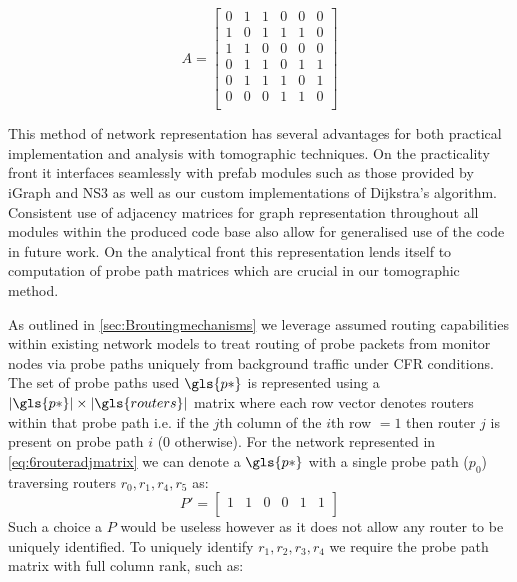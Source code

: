     \begin{equation}\label{eq:6routeradjmatrix}
        A = \begin{bmatrix} 
            0 & 1 & 1 & 0 & 0 & 0 \\
            1 & 0 & 1 & 1 & 1 & 0 \\
            1 & 1 & 0 & 0 & 0 & 0 \\
            0 & 1 & 1 & 0 & 1 & 1 \\
            0 & 1 & 1 & 1 & 0 & 1 \\
            0 & 0 & 0 & 1 & 1 & 0 \\\end{bmatrix}
    \end{equation}
    
    This method of network representation has several advantages for both practical implementation and analysis with tomographic techniques. On the practicality front it interfaces seamlessly with prefab modules such as those provided by iGraph and NS3 as well as our custom implementations of Dijkstra's algorithm. Consistent use of adjacency matrices for graph representation throughout all modules within the produced code base also allow for generalised use of the code in future work. On the analytical front this representation lends itself to computation of probe path matrices which are crucial in our tomographic method.\par
    As outlined in \cref{sec:Broutingmechanisms} we leverage assumed routing capabilities within existing network models to treat routing of probe packets from monitor nodes via probe paths uniquely from background traffic under CFR conditions. The set of probe paths used $\gls{p*}$ is represented using a $|\gls{p*}|\times |\gls{routers}|$ matrix where each row vector denotes routers within that probe path i.e. if the $j$th column of the $i$th row $= 1$ then router $j$ is present on probe path $i$ (0 otherwise). For the network represented in \cref{eq:6routeradjmatrix} we can denote a $\gls{p*}$ with a single probe path ($p_0$) traversing routers $r_0,r_1,r_4,r_5$ as:
    \[
        P'=\begin{bmatrix}
            1 & 1 & 0 & 0 & 1 & 1\\ 
        \end{bmatrix}
    \]
    Such a choice a $P$ would be useless however as it does not allow any router to be uniquely identified. To uniquely identify $r_1,r_2,r_3,r_4$ we require the probe path matrix with full column rank, such as:
